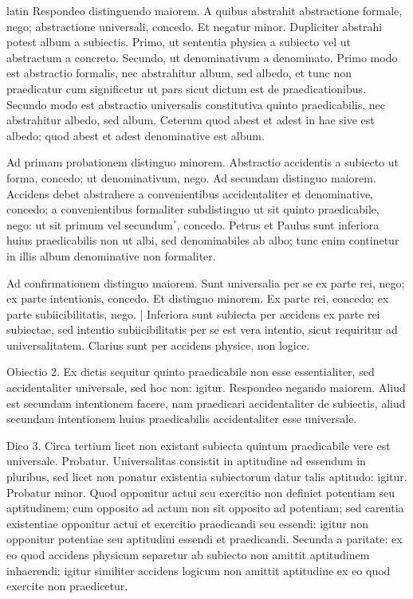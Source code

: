 \begin{otherlanguage*}{latin}
\pstart
  Respondeo distinguendo maiorem. A quibus abstrahit abstractione formale, nego; abstractione universali, concedo. Et negatur minor. Dupliciter abstrahi potest album a subiectis. Primo, ut sententia physica a subiecto vel ut abstractum a concreto. Secundo, ut denominativum a denominato. Primo modo est abstractio formalis, nec abstrahitur album, sed albedo, et tunc non praedicatur cum significetur ut pars sicut dictum est de praedicationibus. Secundo modo est abstractio universalis constitutiva quinto praedicabilis, nec abstrahitur albedo, sed album. Ceterum quod abest et adest in hae sive est albedo; quod abest et adest denominative est album. 
\pend

\pstart
  Ad primam probationem distinguo minorem. Abstractio accidentis a subiecto ut forma, concedo; ut denominativum, nego. Ad secundam distinguo maiorem. Accidens debet abstrahere a convenientibus accidentaliter et denominative, concedo; a convenientibus formaliter subdistinguo ut sit quinto praedicabile, nego: ut sit primum vel secundum΄, concedo. Petrus et Paulus sunt inferiora huius praedicabilis non ut albi, sed denominabiles ab albo; tunc enim continetur in illis album denominative non formaliter. 
\pend

\pstart
  Ad confirmationem distinguo maiorem. Sunt universalia per se ex parte rei, nego; ex parte intentionis, concedo. Et distinguo minorem. Ex parte rei, concedo; ex parte subiicibilitatis, nego. \textnormal{|} Inferiora sunt subiecta per accidens ex parte rei subiectae, sed intentio subiicibilitatis per se est vera intentio, sicut requiritur ad universalitatem. Clarius sunt per accidens physice, non logice. 
\pend

\pstart
  Obiectio 2. Ex dictis sequitur quinto praedicabile non esse essentialiter, sed accidentaliter universale, sed hoc non: igitur. Respondeo negando maiorem. Aliud est secundam intentionem facere, nam praedicari accidentaliter de subiectis, aliud secundam intentionem huius praedicabilis accidentaliter esse universale. 
\pend

\pstart
  Dico 3. Circa tertium licet non existant subiecta quintum praedicabile vere est universale. Probatur. Universalitas consistit in aptitudine ad essendum in pluribus, sed licet non ponatur existentia subiectorum datur talis aptitudo: igitur. Probatur minor. Quod opponitur actui seu exercitio non definiet potentiam seu aptitudinem; cum opposito ad actum non sit opposito ad potentiam; sed carentia existentiae opponitur actui et exercitio praedicandi seu essendi: igitur non opponitur potentiae seu aptitudini essendi et praedicandi. Secunda a paritate: ex eo quod accidens physicum separetur ab subiecto non amittit aptitudinem inhaerendi: igitur similiter accidens logicum non amittit aptitudine ex eo quod exercite non praedicetur. 
\pend


\end{otherlanguage*}
